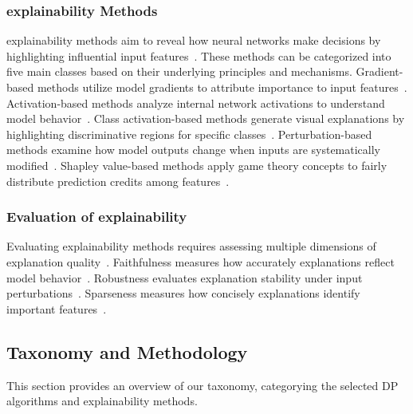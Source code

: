 \documentclass{article}
\begin{document}
\subsubsection{explainability Methods}
explainability methods aim to reveal how neural networks make decisions by highlighting influential input features~\cite{zhang2021survey,fan2021interpretability,dong2017improving,salahuddin2022transparency,li2022interpretable,linardatos2020explainable,ghorbani2019interpretation}. These methods can be categorized into five main classes based on their underlying principles and mechanisms. Gradient-based methods utilize model gradients to attribute importance to input features~\cite{simonyan2014deepinsideconvolutionalnetworks,panda2024human,zeiler2013visualizingunderstandingconvolutionalnetworks,dhamdhere2018importantneuron,leino2018influencedirectedexplanationsdeepconvolutional}. Activation-based methods analyze internal network activations to understand model behavior~\cite{li2021deep}. Class activation-based methods generate visual explanations by highlighting discriminative regions for specific classes~\cite{zhou2016learning,selvaraju2017grad,chattopadhay2018grad,wang2020score,soomro2024grad++}. Perturbation-based methods examine how model outputs change when inputs are systematically modified~\cite{zeiler2013visualizingunderstandingconvolutionalnetworks,ribeiro2016whyitrustyou}. Shapley value-based methods apply game theory concepts to fairly distribute prediction credits among features~\cite{castro2009polynomial,lundberg2017unified}.

\subsubsection{Evaluation of explainability}
Evaluating explainability methods requires assessing multiple dimensions of explanation quality~\cite{zhou2021evaluating,nguyen2020quantitative,carvalho2019machine,gilpin2018explaining}. Faithfulness measures how accurately explanations reflect model behavior~\cite{rong2022consistent,lyu2024towards,dasgupta2022framework}. Robustness evaluates explanation stability under input perturbations~\cite{agarwal2022rethinking,hsieh2020evaluations}. Sparseness measures how concisely explanations identify important features~\cite{chalasani2020concise}.

\subsection{Taxonomy and Methodology}
This section provides an overview of our taxonomy, categorying the selected DP algorithms and explainability methods. 
\end{document}
